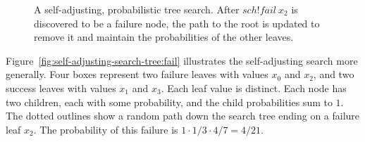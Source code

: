 \begin{figure}[tb!]\centering%
%
\tab%
\caption[Self-adjusting, probabilistic tree search]{A self-adjusting, probabilistic tree search. After $sch!fail~x_2$ is discovered to be a failure node, the path to the root is updated to remove it and maintain the probabilities of the other leaves.}
\label{fig:self-adjusting-search-tree}
\end{figure}

Figure~\ref{fig:self-adjusting-search-tree:fail} illustrates the self-adjusting search more generally.
Four boxes represent two failure leaves with values $x_0$ and $x_2$, and two success leaves with values $x_1$ and $x_3$.
Each leaf value is distinct.
Each node has two children, each with some probability, and the child probabilities sum to $1$.
The dotted outlines show a random path down the search tree ending on a failure leaf $x_2$.
The probability of this failure is $1 \cdot 1{/}3 \cdot 4{/}7 = 4{/}21$.

